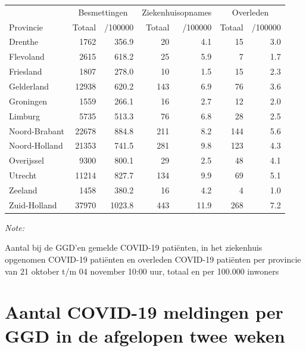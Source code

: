 \documentclass[
  english,
  man,floatsintext]{apa6}
\begin{document}
\begin{table}[H]
\centering
\begin{threeparttable}
\begin{tabular}{lrrrrrr}
\toprule
\multicolumn{1}{c}{ } & \multicolumn{2}{c}{Besmettingen} & \multicolumn{2}{c}{Ziekenhuisopnames} & \multicolumn{2}{c}{Overleden} \\
\cmidrule(l{3pt}r{3pt}){2-3} \cmidrule(l{3pt}r{3pt}){4-5} \cmidrule(l{3pt}r{3pt}){6-7}
Provincie & Totaal & /100000 & Totaal & /100000 & Totaal & /100000\\
\midrule
Drenthe & 1762 & 356.9 & 20 & 4.1 & 15 & 3.0\\
Flevoland & 2615 & 618.2 & 25 & 5.9 & 7 & 1.7\\
Friesland & 1807 & 278.0 & 10 & 1.5 & 15 & 2.3\\
Gelderland & 12938 & 620.2 & 143 & 6.9 & 76 & 3.6\\
Groningen & 1559 & 266.1 & 16 & 2.7 & 12 & 2.0\\
Limburg & 5735 & 513.3 & 76 & 6.8 & 28 & 2.5\\
Noord-Brabant & 22678 & 884.8 & 211 & 8.2 & 144 & 5.6\\
Noord-Holland & 21353 & 741.5 & 281 & 9.8 & 123 & 4.3\\
Overijssel & 9300 & 800.1 & 29 & 2.5 & 48 & 4.1\\
Utrecht & 11214 & 827.7 & 134 & 9.9 & 69 & 5.1\\
Zeeland & 1458 & 380.2 & 16 & 4.2 & 4 & 1.0\\
Zuid-Holland & 37970 & 1023.8 & 443 & 11.9 & 268 & 7.2\\
\bottomrule
\end{tabular}
\begin{tablenotes}
\item \textit{Note: } 
\item Aantal bij de GGD’en gemelde COVID-19 patiënten, in het ziekenhuis opgenomen COVID-19 patiënten en overleden COVID-19 patiënten per provincie van 21 oktober t/m 04 november 10:00 uur, totaal en per 100.000 inwoners
\end{tablenotes}
\end{threeparttable}
\end{table}

\newpage

\hypertarget{aantal-covid-19-meldingen-per-ggd-in-de-afgelopen-twee-weken}{%
\section{Aantal COVID-19 meldingen per GGD in de afgelopen twee weken}\label{aantal-covid-19-meldingen-per-ggd-in-de-afgelopen-twee-weken}}
\end{document}
